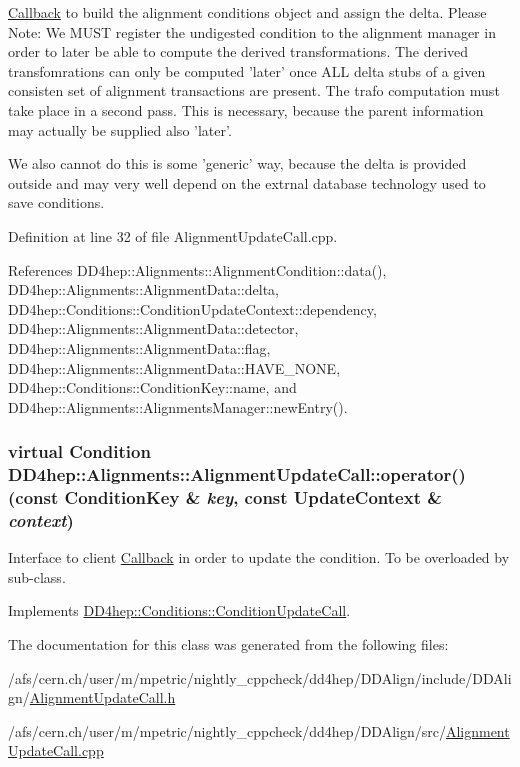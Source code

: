 \hyperlink{class_d_d4hep_1_1_callback}{Callback} to build the alignment conditions object and assign the delta. Please Note: We MUST register the undigested condition to the alignment manager in order to later be able to compute the derived transformations. The derived transfomrations can only be computed 'later' once ALL delta stubs of a given consisten set of alignment transactions are present. The trafo computation must take place in a second pass. This is necessary, because the parent information may actually be supplied also 'later'.

We also cannot do this is some 'generic' way, because the delta is provided outside and may very well depend on the extrnal database technology used to save conditions. 

Definition at line 32 of file AlignmentUpdateCall.cpp.

References DD4hep::Alignments::AlignmentCondition::data(), DD4hep::Alignments::AlignmentData::delta, DD4hep::Conditions::ConditionUpdateContext::dependency, DD4hep::Alignments::AlignmentData::detector, DD4hep::Alignments::AlignmentData::flag, DD4hep::Alignments::AlignmentData::HAVE\_\-NONE, DD4hep::Conditions::ConditionKey::name, and DD4hep::Alignments::AlignmentsManager::newEntry().\hypertarget{class_d_d4hep_1_1_alignments_1_1_alignment_update_call_a1180d2f8d62c0607b86c87853c7eeeb5}{
\subsubsection[{operator()}]{\setlength{\rightskip}{0pt plus 5cm}virtual {\bf Condition} DD4hep::Alignments::AlignmentUpdateCall::operator() (const {\bf ConditionKey} \& {\em key}, \/  const {\bf UpdateContext} \& {\em context})}}
\label{class_d_d4hep_1_1_alignments_1_1_alignment_update_call_a1180d2f8d62c0607b86c87853c7eeeb5}


Interface to client \hyperlink{class_d_d4hep_1_1_callback}{Callback} in order to update the condition. To be overloaded by sub-\/class. 

Implements \hyperlink{class_d_d4hep_1_1_conditions_1_1_condition_update_call_adc561aca8c6bf851e0ee53f719b26a44}{DD4hep::Conditions::ConditionUpdateCall}.

The documentation for this class was generated from the following files:\begin{DoxyCompactItemize}
\item 
/afs/cern.ch/user/m/mpetric/nightly\_\-cppcheck/dd4hep/DDAlign/include/DDAlign/\hyperlink{_alignment_update_call_8h}{AlignmentUpdateCall.h}\item 
/afs/cern.ch/user/m/mpetric/nightly\_\-cppcheck/dd4hep/DDAlign/src/\hyperlink{_alignment_update_call_8cpp}{AlignmentUpdateCall.cpp}\end{DoxyCompactItemize}
